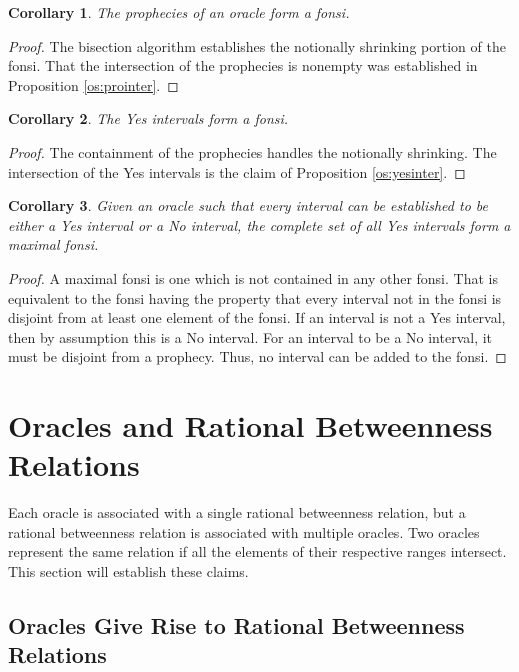 \documentclass[12pt]{article}
\newtheorem{corollary}{Corollary}[section]
\begin{document}
\begin{corollary}
    The prophecies of an oracle form a fonsi.
\end{corollary}

\begin{proof}
    The bisection algorithm establishes the notionally shrinking portion of the fonsi. That the intersection of the prophecies is nonempty was established in Proposition \ref{os:prointer}.
\end{proof}


\begin{corollary}
    The Yes intervals form a fonsi. 
\end{corollary}

\begin{proof}
    The containment of the prophecies handles the notionally shrinking. The intersection of the Yes intervals is the claim of Proposition \ref{os:yesinter}.
\end{proof}


\begin{corollary}
    Given an oracle such that every interval can be established to be either a Yes interval or a No interval, the complete set of all Yes intervals form a maximal fonsi.
\end{corollary}

\begin{proof}
A maximal fonsi is one which is not contained in any other fonsi. That is equivalent to the fonsi having the property that every interval not in the fonsi is disjoint from at least one element of the fonsi. If an interval is not a Yes interval, then by assumption this is a No interval. For an interval to be a No interval, it must be disjoint from a prophecy. Thus, no interval can be added to the fonsi. 
\end{proof}



\section{Oracles and Rational Betweenness Relations}

Each oracle is associated with a single rational betweenness relation, but a rational betweenness relation is associated with multiple oracles. Two oracles represent the same relation if all the elements of their respective ranges intersect. This section will establish these claims. 

\subsection{Oracles Give Rise to Rational Betweenness Relations}
\end{document}
